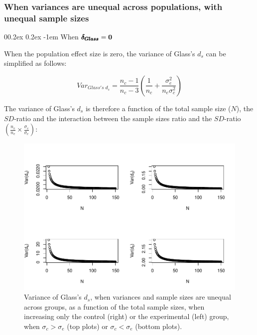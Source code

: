 \documentclass[
  english,
  man,mask]{apa6}
\makeatletter
\let\oldparagraph\paragraph
\renewcommand{\paragraph}[1]{\oldparagraph{#1}\mbox{}}
\renewcommand{\paragraph}{\@startsection{paragraph}{4}{\parindent}%
  {0\baselineskip \@plus 0.2ex \@minus 0.2ex}%
  {-1em}%
  {\normalfont\normalsize\bfseries\itshape\typesectitle}}
\makeatother
\begin{document}
\hypertarget{when-variances-are-unequal-across-populations-with-unequal-sample-sizes}{%
\subsubsection{When variances are unequal across populations, with unequal sample sizes}\label{when-variances-are-unequal-across-populations-with-unequal-sample-sizes}}

\hypertarget{when-bf-pmbdelta_glass0-2}{%
\paragraph{\texorpdfstring{When \(\bf \pmb{\delta_{Glass}}=0\)}{When \textbackslash bf \textbackslash pmb\{\textbackslash delta\_\{Glass\}\}=0}}\label{when-bf-pmbdelta_glass0-2}}

When the population effect size is zero, the variance of Glass's \(d_s\) can be simplified as follows:

\[Var_{Glass's \; d_s} = \frac{n_c-1}{n_c-3} \left( \frac{1}{n_c}+\frac{\sigma^2_e}{n_e\sigma^2_c}\right)\]

The variance of Glass's \(d_s\) is therefore a function of the total sample size (\(N\)), the \(SD\)-ratio and the interaction between the sample sizes ratio and the \(SD\)-ratio \(\left(\frac{n_c}{n_e}\times\frac{\sigma_c}{\sigma_e} \right)\):

\begin{figure}
\centering
\includegraphics{Theoretical-Variance-of-all-estimators-as-a-function-of-population-parameters_files/figure-latex/varglassHetunbalNsize2-1.pdf}
\caption{\label{fig:varglassHetunbalNsize2}Variance of Glass's \(d_s\), when variances and sample sizes are unequal across groups, as a function of the total sample sizes, when increasing only the control (right) or the experimental (left) group, when \(\sigma_c > \sigma_e\) (top plots) or \(\sigma_c < \sigma_e\) (bottom plots).}
\end{figure}
\end{document}
